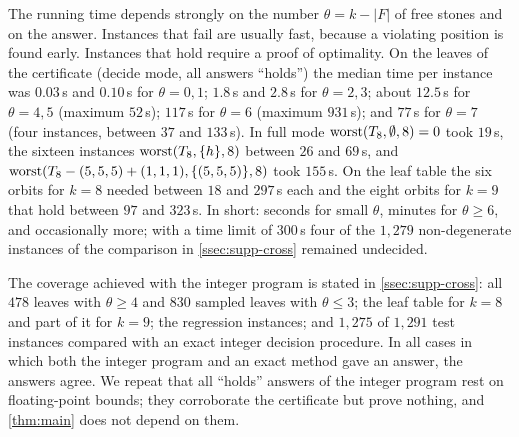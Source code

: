 The running time depends strongly on the number $\theta=k-|F|$ of free stones and on the answer. Instances
that fail are usually fast, because a violating position is found early. Instances that hold require a
proof of optimality. On the leaves of the certificate (decide mode, all answers ``holds'') the median
time per instance was $0.03$\,s and $0.10$\,s for $\theta=0,1$; $1.8$\,s and $2.8$\,s for $\theta=2,3$;
about $12.5$\,s for $\theta=4,5$ (maximum $52$\,s); $117$\,s for $\theta=6$ (maximum $931$\,s); and
$77$\,s for $\theta=7$ (four instances, between $37$ and $133$\,s). In full mode $\operatorname{worst}(T_8,\emptyset,8)=0$ took $19$\,s, the sixteen instances
$\operatorname{worst}(T_8,\{h\},8)$ between $26$ and $69$\,s, and
$\operatorname{worst}(T_8-(5,5,5)+(1,1,1),\{(5,5,5)\},8)$ took $155$\,s. On the leaf table the six orbits for $k=8$
needed between $18$ and $297$\,s each and the eight orbits for $k=9$ that hold between $97$ and $323$\,s. In
short: seconds for small $\theta$, minutes for $\theta\ge6$, and occasionally more; with a time limit of
$300$\,s four of the $1{,}279$ non-degenerate instances of the comparison in \cref{ssec:supp-cross} remained
undecided.

The coverage achieved with the integer program is stated in \cref{ssec:supp-cross}: all $478$ leaves with
$\theta\ge4$ and $830$ sampled leaves with $\theta\le3$; the leaf table for $k=8$ and part of it for $k=9$;
the regression instances; and $1{,}275$ of $1{,}291$ test instances compared with an exact integer decision
procedure. In all cases in which both the integer program and an exact method gave an answer, the answers
agree. We repeat that all ``holds'' answers of the integer program rest on floating-point bounds; they
corroborate the certificate but prove nothing, and \cref{thm:main} does not depend on them.
